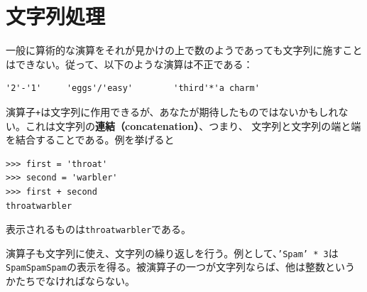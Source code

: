\documentclass[a4j,12pt,makeidx]{jbook}
\begin{document}
\section{文字列処理}
一般に算術的な演算をそれが見かけの上で数のようであっても文字列に施すことはできない。従って、以下のような演算は不正である：
\begin{verbatim}
'2'-'1'     'eggs'/'easy'	     'third'*'a charm'
\end{verbatim}
演算子{\tt +}は文字列に作用できるが、あなたが期待したものではないかもしれない。これは文字列の{\bf 連結（concatenation）}、つまり、
文字列と文字列の端と端を結合することである。例を挙げると
\begin{verbatim}
>>> first = 'throat'
>>> second = 'warbler'
>>> first + second
throatwarbler
\end{verbatim}
表示されるものは{\tt throatwarbler}である。\par
演算子{\tt *}も文字列に使え、文字列の繰り返しを行う。例として、{\tt 'Spam' * 3}は{\tt SpamSpamSpam}の表示を得る。被演算子の一つが文字列ならば、他は整数というかたちでなければならない。
\end{document}
